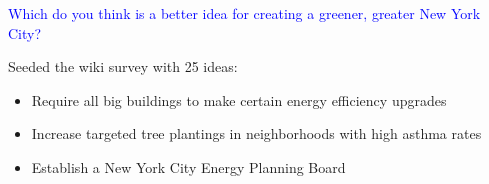 \documentclass[aspectratio=169]{beamer}
\begin{document}
\begin{frame}
\begin{columns}[t]
\begin{center}
\textcolor{blue}{Opinion matrix}
\end{center}
$\left[
\begin{array}{cccc}
\theta_{1,1} & \theta_{1,2} & \ldots & \theta_{1,K} \\
\theta_{2,1} & \theta_{2,2} & \ldots & \theta_{2,K} \\
\vdots & \vdots & \ddots & \vdots\\
\theta_{J,1} & \theta_{J,2} & \ldots & \theta_{J,K} \\
\end{array} 
\right]
$
\vskip 1em
$\theta_{j,k}$: how much respondent $j$ likes item $k$ 
\end{columns}

\end{frame}

\begin{frame}
\frametitle{}

\begin{center}
\textcolor{blue}{\large{Which do you think is a better idea for creating a greener, greater New York City?}}\\
\end{center}

Seeded the wiki survey with 25 ideas: 
\begin{itemize}
\item Require all big buildings to make certain energy efficiency upgrades
\item Increase targeted tree plantings in neighborhoods with high asthma rates
\item Establish a New York City Energy Planning Board
\end{itemize}

\end{frame}
\end{document}
